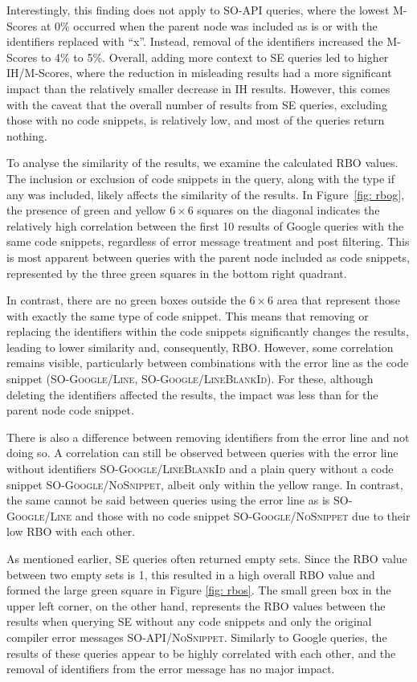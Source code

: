 \documentclass[preprint,12pt]{elsarticle}
\begin{document}
Interestingly, this finding does not apply to \textsc{SO-API} queries, where the lowest M-Scores at 0\% occurred when the parent node was included as is or with the identifiers replaced with ``x''. Instead, removal of the identifiers increased the M-Scores to 4\% to 5\%. Overall, adding more context to SE queries led to higher IH/M-Scores, where the reduction in misleading results had a more significant impact than the relatively smaller decrease in IH results. However, this comes with the caveat that the overall number of results from SE queries, excluding those with no code snippets, is relatively low, and most of the queries return nothing.

To analyse the similarity of the results, we examine the calculated RBO values. The inclusion or exclusion of code snippets in the query, along with the type if any was included, likely affects the similarity of the results. In Figure~\ref{fig: rbog}, the presence of green and yellow $6\times6$ squares on the diagonal indicates the relatively high correlation between the first 10 results of Google queries with the same code snippets, regardless of error message treatment and post filtering. This is most apparent between queries with the parent node included as code snippets, represented by the three green squares in the bottom right quadrant.

In contrast, there are no green boxes outside the $6\times6$ area that represent those with exactly the same type of code snippet. This means that removing or replacing the identifiers within the code snippets significantly changes the results, leading to lower similarity and, consequently, RBO. However, some correlation remains visible, particularly between combinations with the error line as the code snippet (\textsc{SO-Google/Line}, \textsc{SO-Google/LineBlankId}). For these, although deleting the identifiers affected the results, the impact was less than for the parent node code snippet.

There is also a difference between removing identifiers from the error line and not doing so. A correlation can still be observed between queries with the error line without identifiers \textsc{SO-Google/LineBlankId} and a plain query without a code snippet \textsc{SO-Google/NoSnippet}, albeit only within the yellow range. In contrast, the same cannot be said between queries using the error line as is \textsc{SO-Google/Line} and those with no code snippet \textsc{SO-Google/NoSnippet} due to their low RBO with each other.

As mentioned earlier, SE queries often returned empty sets. Since the RBO value between two empty sets is 1, this resulted in a high overall RBO value and formed the large green square in Figure \ref{fig: rbos}. The small green box in the upper left corner, on the other hand, represents the RBO values between the results when querying SE without any code snippets and only the original compiler error messages \textsc{SO-API/NoSnippet}. Similarly to Google queries, the results of these queries appear to be highly correlated with each other, and the removal of identifiers from the error message has no major impact.
\end{document}
